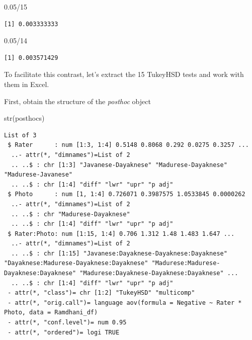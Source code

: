 \documentclass[
  11pt,
]{book}
\newenvironment{Shaded}{\begin{snugshade}}{\end{snugshade}}
\newcommand{\DecValTok}[1]{\textcolor[rgb]{0.00,0.00,0.81}{#1}}
\newcommand{\FloatTok}[1]{\textcolor[rgb]{0.00,0.00,0.81}{#1}}
\newcommand{\FunctionTok}[1]{\textcolor[rgb]{0.00,0.00,0.00}{#1}}
\newcommand{\NormalTok}[1]{#1}
\newcommand{\SpecialCharTok}[1]{\textcolor[rgb]{0.00,0.00,0.00}{#1}}
\begin{document}
\begin{Shaded}
\begin{Highlighting}[]
\FloatTok{0.05}\SpecialCharTok{/}\DecValTok{15}
\end{Highlighting}
\end{Shaded}

\begin{verbatim}
[1] 0.003333333
\end{verbatim}

\begin{Shaded}
\begin{Highlighting}[]
\FloatTok{0.05}\SpecialCharTok{/}\DecValTok{14}
\end{Highlighting}
\end{Shaded}

\begin{verbatim}
[1] 0.003571429
\end{verbatim}

To facilitate this contrast, let's extract the 15 TukeyHSD tests and work with them in Excel.

First, obtain the structure of the \emph{posthoc} object

\begin{Shaded}
\begin{Highlighting}[]
\FunctionTok{str}\NormalTok{(posthocs)}
\end{Highlighting}
\end{Shaded}

\begin{verbatim}
List of 3
 $ Rater      : num [1:3, 1:4] 0.5148 0.8068 0.292 0.0275 0.3257 ...
  ..- attr(*, "dimnames")=List of 2
  .. ..$ : chr [1:3] "Javanese-Dayaknese" "Madurese-Dayaknese" "Madurese-Javanese"
  .. ..$ : chr [1:4] "diff" "lwr" "upr" "p adj"
 $ Photo      : num [1, 1:4] 0.726071 0.3987575 1.0533845 0.0000262
  ..- attr(*, "dimnames")=List of 2
  .. ..$ : chr "Madurese-Dayaknese"
  .. ..$ : chr [1:4] "diff" "lwr" "upr" "p adj"
 $ Rater:Photo: num [1:15, 1:4] 0.706 1.312 1.48 1.483 1.647 ...
  ..- attr(*, "dimnames")=List of 2
  .. ..$ : chr [1:15] "Javanese:Dayaknese-Dayaknese:Dayaknese" "Dayaknese:Madurese-Dayaknese:Dayaknese" "Madurese:Madurese-Dayaknese:Dayaknese" "Madurese:Dayaknese-Dayaknese:Dayaknese" ...
  .. ..$ : chr [1:4] "diff" "lwr" "upr" "p adj"
 - attr(*, "class")= chr [1:2] "TukeyHSD" "multicomp"
 - attr(*, "orig.call")= language aov(formula = Negative ~ Rater * Photo, data = Ramdhani_df)
 - attr(*, "conf.level")= num 0.95
 - attr(*, "ordered")= logi TRUE
\end{verbatim}
\end{document}
